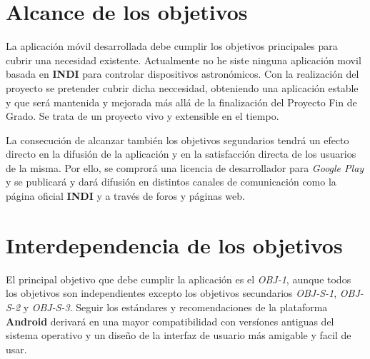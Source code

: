 \section{Alcance de los objetivos}

La aplicación móvil desarrollada debe cumplir los objetivos principales para cubrir una necesidad existente. Actualmente no he siste ninguna aplicación movil basada en \textbf{INDI} para controlar dispositivos astronómicos. Con la realización del proyecto se pretender cubrir dicha neccesidad, obteniendo una aplicación estable y que será mantenida y mejorada más allá de la finalización del Proyecto Fin de Grado. Se trata de un proyecto vivo y extensible en el tiempo.

\bigskip
La consecución de alcanzar también los objetivos segundarios tendrá un efecto directo en la difusión de la aplicación y en la satisfacción directa de los usuarios de la misma. Por ello, se comprorá una licencia de desarrollador para \textit{Google Play} y se publicará y dará difusión en distintos canales de comunicación como la página oficial \textbf{INDI} y a través de foros y páginas web.


\section{Interdependencia de los objetivos}

El principal objetivo que debe cumplir la aplicación es el \textit{OBJ-1}, aunque todos los objetivos son independientes excepto los objetivos secundarios \textit{OBJ-S-1}, \textit{OBJ-S-2} y \textit{OBJ-S-3}. Seguir los estándares y recomendaciones de la plataforma \textbf{Android} derivará en una mayor compatibilidad con versíones antiguas del sistema operativo y un diseño de la interfaz de usuario más amigable y facil de usar. 